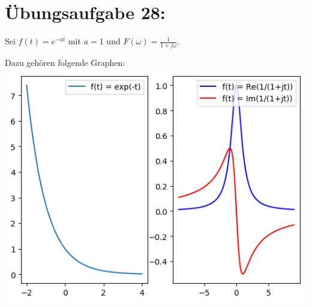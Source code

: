 

	\section*{Übungsaufgabe 28:}
		Sei $f(t) = e^{-at}$ mit $a = 1$ und $F(\omega) =  \frac{1}{1+j\omega}$.
		
		Dazu gehören folgende Graphen:\\
		\includegraphics[width=\textwidth]{A28_graphPlot.png}
